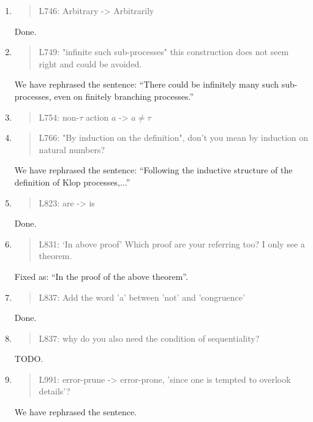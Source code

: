 \begin{enumerate}
\item \begin{quote}
    L746: Arbitrary -> Arbitrarily
  \end{quote}
  Done.
  
\item \begin{quote}
    L749: "infinite such sub-processes" this construction does not seem right and could be avoided.
  \end{quote}
  We have rephrased the sentence: ``There could be infinitely many such sub-processes, even on finitely
  branching processes.''
  
\item \begin{quote}
    L754: non-$\tau$ action $a$ -> $a\neq\tau$
  \end{quote}

\item \begin{quote}
    L766: "By induction on the definition", don't you mean by induction on natural numbers?
  \end{quote}
  We have rephrased the sentence: ``Following the inductive structure
  of the definition of Klop processes,...''
  
\item \begin{quote}
    L823: are -> is
  \end{quote}
  Done.
  
\item \begin{quote}
    L831: `In above proof’ Which proof are your referring too? I only see a theorem.
  \end{quote}
  Fixed as: ``In the proof of the above theorem''.
  
\item \begin{quote}
    L837: Add the word 'a' between 'not' and 'congruence'
  \end{quote}
  Done.
  
\item \begin{quote}
    L837: why do you also need the condition of sequentiality?
  \end{quote}
  TODO.
  
\item \begin{quote}
    L991: error-prune -> error-prone, ’since one is tempted to overlook details’?
  \end{quote}
  We have rephrased the sentence.
  

\end{enumerate}
